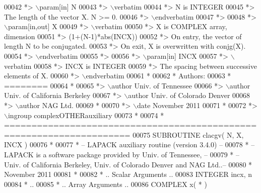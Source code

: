 \begin{DoxyCode}
00042 \textcolor{comment}{*> \(\backslash\)param[in] N}
00043 \textcolor{comment}{*> \(\backslash\)verbatim}
00044 \textcolor{comment}{*>          N is INTEGER}
00045 \textcolor{comment}{*>          The length of the vector X.  N >= 0.}
00046 \textcolor{comment}{*> \(\backslash\)endverbatim}
00047 \textcolor{comment}{*>}
00048 \textcolor{comment}{*> \(\backslash\)param[in,out] X}
00049 \textcolor{comment}{*> \(\backslash\)verbatim}
00050 \textcolor{comment}{*>          X is COMPLEX array, dimension}
00051 \textcolor{comment}{*>                         (1+(N-1)*abs(INCX))}
00052 \textcolor{comment}{*>          On entry, the vector of length N to be conjugated.}
00053 \textcolor{comment}{*>          On exit, X is overwritten with conjg(X).}
00054 \textcolor{comment}{*> \(\backslash\)endverbatim}
00055 \textcolor{comment}{*>}
00056 \textcolor{comment}{*> \(\backslash\)param[in] INCX}
00057 \textcolor{comment}{*> \(\backslash\)verbatim}
00058 \textcolor{comment}{*>          INCX is INTEGER}
00059 \textcolor{comment}{*>          The spacing between successive elements of X.}
00060 \textcolor{comment}{*> \(\backslash\)endverbatim}
00061 \textcolor{comment}{*}
00062 \textcolor{comment}{*  Authors:}
00063 \textcolor{comment}{*  ========}
00064 \textcolor{comment}{*}
00065 \textcolor{comment}{*> \(\backslash\)author Univ. of Tennessee }
00066 \textcolor{comment}{*> \(\backslash\)author Univ. of California Berkeley }
00067 \textcolor{comment}{*> \(\backslash\)author Univ. of Colorado Denver }
00068 \textcolor{comment}{*> \(\backslash\)author NAG Ltd. }
00069 \textcolor{comment}{*}
00070 \textcolor{comment}{*> \(\backslash\)date November 2011}
00071 \textcolor{comment}{*}
00072 \textcolor{comment}{*> \(\backslash\)ingroup complexOTHERauxiliary}
00073 \textcolor{comment}{*}
00074 \textcolor{comment}{*  =====================================================================}
00075 \textcolor{keyword}{      SUBROUTINE }clacgv( N, X, INCX )
00076 \textcolor{comment}{*}
00077 \textcolor{comment}{*  -- LAPACK auxiliary routine (version 3.4.0) --}
00078 \textcolor{comment}{*  -- LAPACK is a software package provided by Univ. of Tennessee,    --}
00079 \textcolor{comment}{*  -- Univ. of California Berkeley, Univ. of Colorado Denver and NAG Ltd..--}
00080 \textcolor{comment}{*     November 2011}
00081 \textcolor{comment}{*}
00082 \textcolor{comment}{*     .. Scalar Arguments ..}
00083       \textcolor{keywordtype}{INTEGER}            incx, n
00084 \textcolor{comment}{*     ..}
00085 \textcolor{comment}{*     .. Array Arguments ..}
00086       \textcolor{keywordtype}{COMPLEX}            x( * )

\end{DoxyCode}
